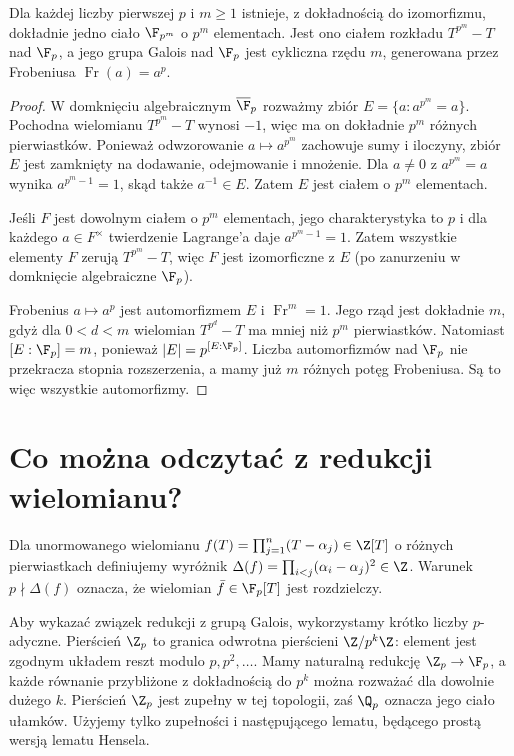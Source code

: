 \begin{twierdzenie}
Dla każdej liczby pierwszej $p$ i $m\ge1$ istnieje, z dokładnością do izomorfizmu, dokładnie jedno ciało $\F_{p^m}$ o $p^m$ elementach. Jest ono ciałem rozkładu $T^{p^m}-T$ nad $\F_p$, a jego grupa Galois nad $\F_p$ jest cykliczna rzędu $m$, generowana przez Frobeniusa $\operatorname{Fr}(a)=a^p$.
\end{twierdzenie}
\begin{proof}
W domknięciu algebraicznym $\overline{\F}_p$ rozważmy zbiór $E=\{a:a^{p^m}=a\}$. Pochodna wielomianu $T^{p^m}-T$ wynosi $-1$, więc ma on dokładnie $p^m$ różnych pierwiastków. Ponieważ odwzorowanie $a\mapsto a^{p^m}$ zachowuje sumy i iloczyny, zbiór $E$ jest zamknięty na dodawanie, odejmowanie i mnożenie. Dla $a\ne0$ z $a^{p^m}=a$ wynika $a^{p^m-1}=1$, skąd także $a^{-1}\in E$. Zatem $E$ jest ciałem o $p^m$ elementach.

Jeśli $F$ jest dowolnym ciałem o $p^m$ elementach, jego charakterystyka to $p$ i dla każdego $a\in F^\times$ twierdzenie Lagrange'a daje $a^{p^m-1}=1$. Zatem wszystkie elementy $F$ zerują $T^{p^m}-T$, więc $F$ jest izomorficzne z $E$ (po zanurzeniu w domknięcie algebraiczne $\F_p$).

Frobenius $a\mapsto a^p$ jest automorfizmem $E$ i $\operatorname{Fr}^m=1$. Jego rząd jest dokładnie $m$, gdyż dla $0<d<m$ wielomian $T^{p^d}-T$ ma mniej niż $p^m$ pierwiastków. Natomiast $[E:\F_p]=m$, ponieważ $|E|=p^{[E:\F_p]}$. Liczba automorfizmów nad $\F_p$ nie przekracza stopnia rozszerzenia, a mamy już $m$ różnych potęg Frobeniusa. Są to więc wszystkie automorfizmy.
\end{proof}

\section{Co można odczytać z redukcji wielomianu?}

Dla unormowanego wielomianu $f(T)=\prod_{j=1}^n(T-\alpha_j)\in\Z[T]$ o różnych pierwiastkach definiujemy wyróżnik
$\Delta(f)=\prod_{i<j}(\alpha_i-\alpha_j)^2\in\Z$. Warunek $p\nmid\Delta(f)$ oznacza, że wielomian $\bar f\in\F_p[T]$ jest rozdzielczy.

Aby wykazać związek redukcji z grupą Galois, wykorzystamy krótko liczby $p$-adyczne. Pierścień $\Z_p$ to granica odwrotna pierścieni $\Z/p^k\Z$: element jest zgodnym układem reszt modulo $p,p^2,\ldots$. Mamy naturalną redukcję $\Z_p\to\F_p$, a każde równanie przybliżone z dokładnością do $p^k$ można rozważać dla dowolnie dużego $k$. Pierścień $\Z_p$ jest zupełny w tej topologii, zaś $\Q_p$ oznacza jego ciało ułamków. Użyjemy tylko zupełności i następującego lematu, będącego prostą wersją lematu Hensela.


